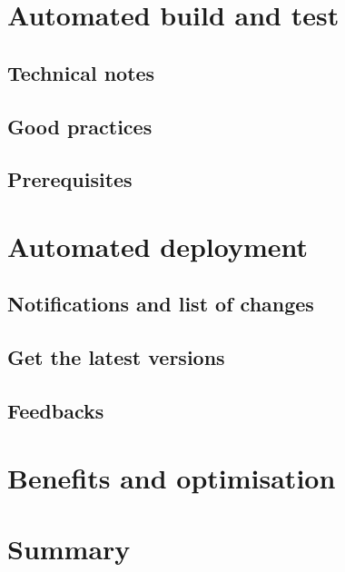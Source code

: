 \documentclass{beamer}
\begin{document}
\section[Automated build and test]{Automated build and test}
\subsection[Technical notes]{Technical notes}

\subsection[Good practices]{Good practices}

\subsection[Prerequisites]{Prerequisites}

\section[Automated deployment]{Automated deployment}

\subsection[Notifications and list of changes]{Notifications and list of
changes}

\subsection[Get the latest versions]{Get the latest versions}

\subsection[feedbacks]{Feedbacks}

\section[Benefits and optimisation]{Benefits and optimisation}


\section*{Summary}
\end{document}
